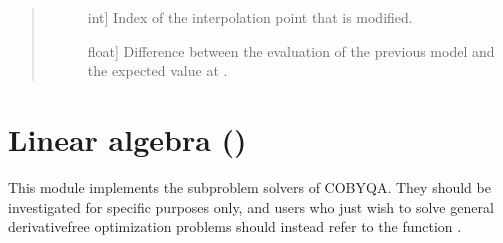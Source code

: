 \documentclass[letterpaper,10pt,english]{sphinxmanual}
\begin{document}
\begin{fulllineitems}
\begin{fulllineitems}
\begin{quote}
\begin{description}
\begin{description}
\item[{}] \leavevmode{[}int{]}
\sphinxAtStartPar
Index of the interpolation point that is modified.

\item[{}] \leavevmode{[}float{]}
\sphinxAtStartPar
Difference between the evaluation of the previous model and the
expected value at .

\end{description}

\end{description}\end{quote}

\end{fulllineitems}


\end{fulllineitems}

\label{\detokenize{refs/linalg:module-cobyqa.linalg}}

\chapter{Linear algebra ()}
\label{\detokenize{refs/linalg:linear-algebra-cobyqa-linalg}}\label{\detokenize{refs/linalg::doc}}
\sphinxAtStartPar
This module implements the subproblem solvers of COBYQA. They should be
investigated for specific purposes only, and users who just wish to solve
general derivative\sphinxhyphen{}free optimization problems should instead refer to the
function {\hyperref[\detokenize{refs/generated/cobyqa.minimize:cobyqa.minimize}]{}}.
\end{document}
